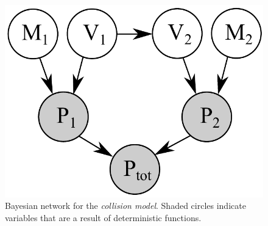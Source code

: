 \begin{figure}[t!]
\vspace{-3mm}
\begin{center}
 \includegraphics[width=0.33\linewidth]{Figs/little-momentum1.pdf} 
\end{center}
\vspace{-4mm}
\caption{\footnotesize
Bayesian network for the \emph{collision model}. 
Shaded circles indicate variables that are a result of deterministic functions.} 
\label{fig:mom0}
\vspace{-2mm}
\end{figure}


